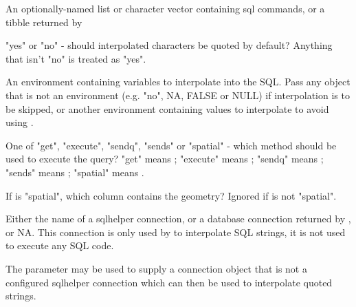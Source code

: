\documentclass[a4paper]{book}
\begin{document}
\begin{Arguments}
\begin{ldescription}
\item[\code{sql}] An optionally-named list or character vector containing sql
commands, or a tibble returned by 

\item[\code{quotesql}] "yes" or "no" - should interpolated characters be quoted by
default? Anything that isn't "no" is treated as "yes".

\item[\code{values}] An environment containing variables to interpolate into the
SQL. Pass any object that is not an environment (e.g. "no", NA, FALSE or
NULL) if interpolation is to be skipped, or another environment containing
values to interpolate to avoid using .

\item[\code{execmethod}] One of "get", "execute", "sendq", "sends" or "spatial" -
which method should be used to execute the query? "get" means
; "execute" means ; "sendq" means
; "sends" means ; "spatial"
means .

\item[\code{geometry}] If  is "spatial", which column contains the
geometry? Ignored if  is not "spatial".

\item[\code{default.conn}] Either the name of a sqlhelper connection, or a database
connection returned by , or NA. This connection is only
used by  to interpolate SQL strings, it is not used to
execute any SQL code.
\end{ldescription}
\end{Arguments}
%
\begin{Details}\relax
The  parameter may be used to supply a connection object that
is not a configured sqlhelper connection which can then be used to interpolate
quoted strings.
\end{Details}
%
\end{document}
